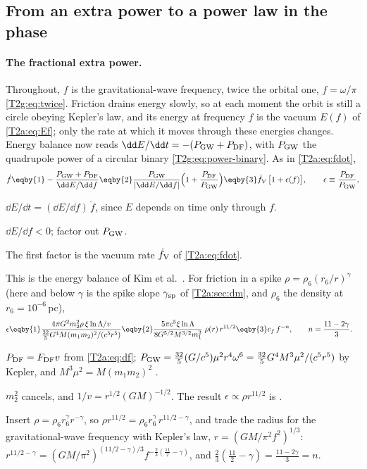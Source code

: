 \subsection{From an extra power to a power law in the phase}

\paragraph{The fractional extra power.}
Throughout, $f$ is the gravitational-wave frequency, twice the orbital one, $f=\omega/\pi$ \eqref{T2g:eq:twice}. Friction drains energy slowly, so at each moment the orbit is still a circle obeying Kepler's law, and its energy at frequency $f$ is the vacuum $E(f)$ of \eqref{T2a:eq:Ef}; only the rate at which it moves through these energies changes. Energy balance now reads $\dd E/\dd t=-(P_{\rm GW}+P_{\rm DF})$, with $P_{\rm GW}$ the quadrupole power of a circular binary \eqref{T2g:eq:power-binary}. As in \eqref{T2a:eq:fdot},
\begin{equation}
  \dot f\eqby{1}-\frac{P_{\rm GW}+P_{\rm DF}}{\dd E/\dd f}
  \eqby{2}\frac{P_{\rm GW}}{\lvert\dd E/\dd f\rvert}\Big(1+\frac{P_{\rm DF}}{P_{\rm GW}}\Big)
  \eqby{3}\dot f_{\rm V}\,\big[1+\epsilon(f)\big],\qquad \epsilon\equiv\frac{P_{\rm DF}}{P_{\rm GW}},
  \label{T2a:eq:fdot-env}
\end{equation}
\begin{explain}
  \item $\dd E/\dd t=(\dd E/\dd f)\,\dot f$, since $E$ depends on time only through $f$.
  \item $\dd E/\dd f<0$; factor out $P_{\rm GW}$.
  \item The first factor is the vacuum rate $\dot f_{\rm V}$ of \eqref{T2a:eq:fdot}.
\end{explain}
This is the energy balance of Kim et al.\ \cite[eq.~(36)]{Kim2023}. For friction in a spike $\rho=\rho_6(r_6/r)^\gamma$ (here and below $\gamma$ is the spike slope $\gamma_{\rm sp}$ of \cref{T2a:sec:dm}, and $\rho_6$ the density at $r_6=10^{-6}$\,pc),
\begin{align}
  \epsilon
  &\eqby{1}\frac{4\pi G^2m_2^2\rho\,\xi\ln\Lambda/v}{\frac{32}{5}G^4M(m_1m_2)^2/(c^5r^5)}
  \eqby{2}\frac{5\pi c^5\xi\ln\Lambda}{8G^{5/2}M^{3/2}m_1^2}\;\rho(r)\,r^{11/2}
  \eqby{3}c_f\,f^{-n},\qquad n=\frac{11-2\gamma}{3}.\label{T2a:eq:eps}
\end{align}
\begin{explain}
  \item $P_{\rm DF}=F_{\rm DF}v$ from \eqref{T2a:eq:df}; $P_{\rm GW}=\tfrac{32}{5}(G/c^5)\mu^2r^4\omega^6=\tfrac{32}{5}G^4M^3\mu^2/(c^5r^5)$ by Kepler, and $M^3\mu^2=M(m_1m_2)^2$ \cite[eq.~(6)]{Coogan2022}.
  \item $m_2^2$ cancels, and $1/v=r^{1/2}(GM)^{-1/2}$. The result $\epsilon\propto\rho r^{11/2}$ is \cite[eq.~(16)]{Speeney2022}.
  \item Insert $\rho=\rho_6r_6^\gamma r^{-\gamma}$, so $\rho r^{11/2}=\rho_6r_6^\gamma\,r^{11/2-\gamma}$, and trade the radius for the gravitational-wave frequency with Kepler's law, $r=(GM/\pi^2f^2)^{1/3}$: $r^{11/2-\gamma}=(GM/\pi^2)^{(11/2-\gamma)/3}f^{-\frac23(\frac{11}2-\gamma)}$, and $\frac23(\frac{11}2-\gamma)=\frac{11-2\gamma}3=n$.
\end{explain}
